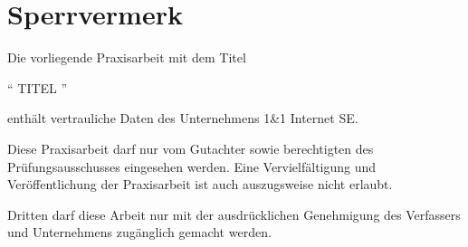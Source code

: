 \documentclass[fontsize=12pt,DIV=11,BCOR=4mm,fleqn]{scrartcl}
\begin{document}
	\pagebreak{}
	\clearpage
	\vspace*{2.1cm}
	\section*{Sperrvermerk}
		Die vorliegende Praxisarbeit mit dem Titel 
		
		\begin{center}
			"` TITEL "'
		\end{center}
		
		enthält vertrauliche Daten des Unternehmens 1\&1 Internet SE. \vspace{5pt}
	
		Diese Praxisarbeit darf nur vom Gutachter sowie berechtigten des Prüfungsausschusses eingesehen werden. Eine Vervielfältigung und Veröffentlichung der Praxisarbeit ist auch auszugsweise nicht erlaubt. \vspace{5pt}
	
		Dritten darf diese Arbeit nur mit der ausdrücklichen Genehmigung des Verfassers und Unternehmens zugänglich gemacht werden.
	
	\pagebreak{}
	\clearpage
	\vspace*{0.1cm}
	\tableofcontents{} \thispagestyle{empty} 
	
	\pagebreak{}
	\clearpage
	\clearscrheadings
	\cfoot{\pagemark}
	\setcounter{page}{5} 
	\vspace*{2.5cm}
	\listoffigures{}
	
	\pagebreak{}
	\vspace*{2.5cm}
	\listoftables{}
		
\end{document}
